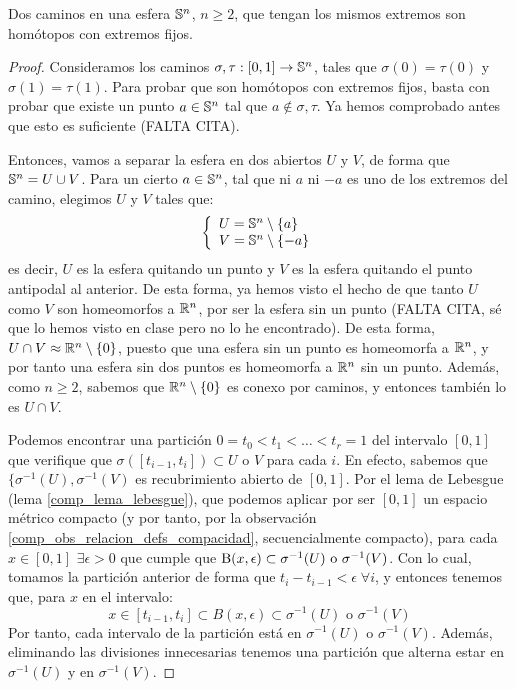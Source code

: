 \begin{prop}
	\label{grf_homotop_caminos_esfera}
	Dos caminos en una esfera $\mathbb{S}^n$, $n\geq 2$, que tengan los mismos extremos son homótopos con extremos fijos.

	\begin{proof}
		Consideramos los caminos $\sigma,\tau:[0,1]\to \mathbb{S}^n$, tales que $\sigma(0)=\tau(0)$ y $\sigma(1)=\tau(1)$. Para probar que son homótopos con extremos fijos, basta con probar que existe un punto $a\in\mathbb{S}^n$ tal que $a\not\in \sigma,\tau$. Ya hemos comprobado antes que esto es suficiente (FALTA CITA). %
		
		Entonces, vamos a separar la esfera en dos abiertos $U$ y $V$, de forma que $\mathbb{S}^n=U\cup V$. Para un cierto $a\in\mathbb{S}^n$, tal que ni $a$ ni $-a$ es uno de los extremos del camino, elegimos $U$ y $V$ tales que:
		\[\left\{\begin{array}{l}
			U = \mathbb{S}^n\setminus\{a\} \\
			V = \mathbb{S}^n\setminus\{-a\}
		\end{array}\right.\]
		es decir, $U$ es la esfera quitando un punto y $V$ es la esfera quitando el punto antipodal al anterior. De esta forma, ya hemos visto el hecho de que tanto $U$ como $V$ son homeomorfos a $\mathbb{R}^n$, por ser la esfera sin un punto (FALTA CITA, sé que lo hemos visto en clase pero no lo he encontrado). De esta forma, $U\cap V\approx\mathbb{R}^n\setminus\{0\}$, puesto que una esfera sin un punto es homeomorfa a $\mathbb{R}^n$, y por tanto una esfera sin dos puntos es homeomorfa a $\mathbb{R}^n$ sin un punto. Además, como $n\geq 2$, sabemos que $\mathbb{R}^n\setminus\{0\}$ es conexo por caminos, y entonces también lo es $U\cap V$. %
		
		Podemos encontrar una partición $0=t_0<t_1<\dots<t_r=1$ del intervalo $[0,1]$ que verifique que $\sigma([t_{i-1},t_i])\subset U\text{ o }V$ para cada $i$. En efecto, sabemos que $\{\sigma^{-1}(U), \sigma^{-1}(V)$ es recubrimiento abierto de $[0,1]$. Por el lema de Lebesgue (lema \ref{comp_lema_lebesgue}), que podemos aplicar por ser $[0,1]$ un espacio métrico compacto (y por tanto, por la observación \ref{comp_obs_relacion_defs_compacidad}, secuencialmente compacto), para cada $x\in [0,1]$ $\exists\epsilon>0$ que cumple que $\operatorname{B}(x,\epsilon)\subset\sigma^{-1}(U)\text{ o }\sigma^{-1}(V)$. Con lo cual, tomamos la partición anterior de forma que $t_i-t_{i-1}<\epsilon\;\forall i$, y entonces tenemos que, para $x$ en el intervalo:
		\[x\in [t_{i-1}, t_i]\subset B(x,\epsilon)\subset\sigma^{-1}(U)\text{ o }\sigma^{-1}(V)\]
		Por tanto, cada intervalo de la partición está en $\sigma^{-1}(U)$ o $\sigma^{-1}(V)$. Además, eliminando las divisiones innecesarias tenemos una partición que alterna estar en $\sigma^{-1}(U)$ y en $\sigma^{-1}(V)$.
		

\end{proof}
\end{prop}
